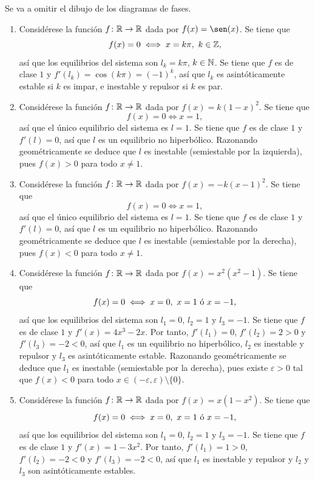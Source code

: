 \documentclass[11pt]{report}
\begin{document}
\begin{solution}
    Se va a omitir el dibujo de los diagramas de fases.
    \begin{enumerate}
        \item Considérese la función $f \colon \mathbb R \to \mathbb R$ dada por $f(x) = \sen(x)$. Se tiene que
        \[f(x) = 0 \iff x = k\pi, \ k \in \mathbb Z,\]
        así que los equilibrios del sistema son $l_k = k\pi$, $k \in \mathbb N$. Se tiene que $f$ es de clase $1$ y $f'(l_k) = \cos(k\pi) = (-1)^k$, así que $l_k$ es asintóticamente estable si $k$ es impar, e inestable y repulsor si $k$ es par.
        \item Considérese la función $f \colon \mathbb R \to \mathbb R$ dada por $f(x) = k(1-x)^2$. Se tiene que
        \[f(x) = 0 \iff x = 1,\]
        así que el único equilibrio del sistema es $l = 1$. Se tiene que $f$ es de clase $1$ y $f'(l) = 0$, así que $l$ es un equilibrio no hiperbólico. Razonando geométricamente se deduce que $l$ es inestable (semiestable por la izquierda), pues $f(x) > 0$ para todo $x \neq 1$.
        \item Considérese la función $f \colon \mathbb R \to \mathbb R$ dada por $f(x) = -k(x-1)^2$. Se tiene que
        \[f(x) = 0 \iff x = 1,\]
        así que el único equilibrio del sistema es $l = 1$. Se tiene que $f$ es de clase $1$ y $f'(l) = 0$, así que $l$ es un equilibrio no hiperbólico. Razonando geométricamente se deduce que $l$ es inestable (semiestable por la derecha), pues $f(x) < 0$ para todo $x \neq 1$.
        \item Considérese la función $f \colon \mathbb R \to \mathbb R$ dada por $f(x) = x^2(x^2-1)$. Se tiene que
        \[f(x) = 0 \iff x = 0, \ x = 1 \textup{ ó } x = -1,\]
        así que los equilibrios del sistema son $l_1 = 0$, $l_2 = 1$ y $l_3 = -1$. Se tiene que $f$ es de clase $1$ y $f'(x) = 4x^3-2x$. Por tanto, $f'(l_1) = 0$, $f'(l_2) = 2 > 0$ y $f'(l_3) = -2 < 0$, así que $l_1$ es un equilibrio no hiperbólico, $l_2$ es inestable y repulsor y $l_3$ es asintóticamente estable. Razonando geométricamente se deduce que $l_1$ es inestable (semiestable por la derecha), pues existe $\varepsilon > 0$ tal que $f(x) < 0$ para todo $x \in (-\varepsilon,\varepsilon) \setminus\{0\}$. 
        \item Considérese la función $f \colon \mathbb R \to \mathbb R$ dada por $f(x) = x(1-x^2)$. Se tiene que
        \[f(x) = 0 \iff x = 0, \ x = 1 \textup{ ó } x = -1,\]
        así que los equilibrios del sistema son $l_1 = 0$, $l_2 = 1$ y $l_3 = -1$. Se tiene que $f$ es de clase $1$ y $f'(x) = 1-3x^2$. Por tanto, $f'(l_1) = 1 > 0$, $f'(l_2) =-2 < 0$ y $f'(l_3) = -2 < 0$, así que $l_1$ es inestable y repulsor y $l_2$ y $l_3$ son asintóticamente estables. 
    \end{enumerate}
\end{solution}
\end{document}
